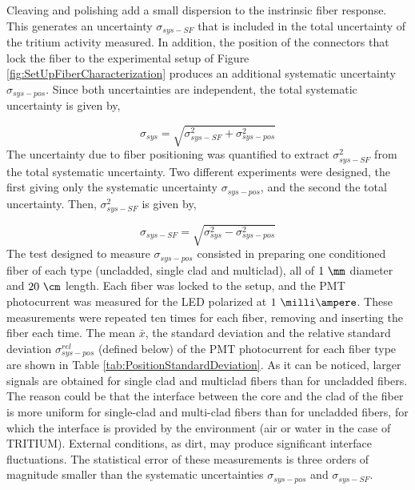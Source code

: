 Cleaving and polishing add a small dispersion to the instrinsic fiber response. This generates an uncertainty $\sigma_{sys-SF}$ that is included in the total uncertainty of the tritium activity measured. In addition, the position of the connectors that lock the fiber to the experimental setup of Figure \ref{fig:SetUpFiberCharacterization} produces an additional systematic uncertainty $\sigma_{sys-pos}$. Since both uncertainties are independent, the total systematic uncertainty is given by,

\begin{equation}
\sigma_{sys} = \sqrt{\sigma^2_{sys-SF} + \sigma^2_{sys-pos} }
\label{eq:TotalUncertaintyFiberCharacterization}
\end{equation}
The uncertainty due to fiber positioning was quantified to extract $\sigma^2_{sys-SF}$ from the total systematic uncertainty. Two different experiments were designed, the first giving only the systematic uncertainty $\sigma_{sys-pos}$, and the second the total uncertainty. Then, $\sigma^2_{sys-SF}$ is given by,

\begin{equation}
\sigma_{sys-SF} = \sqrt{\sigma^2_{sys} - \sigma^2_{sys-pos} }
\label{eq:TMUncertaintyFiberCharacterization}
\end{equation}
The test designed to measure $\sigma_{sys-pos}$ consisted in preparing one conditioned fiber of each type (uncladded, single clad and multiclad), all of $1~\mm$ diameter and $20~\cm$ length. Each fiber was locked to the setup, and the PMT photocurrent was measured for the LED polarized at $1~\milli\ampere$. These measurements were repeated ten times for each fiber, removing and inserting the fiber each time. The mean $\bar{x}$, the standard deviation  and the relative standard deviation $\sigma^{rel}_{sys-pos}$ (defined below) of the PMT photocurrent for each fiber type are shown in Table \ref{tab:PositionStandardDeviation}. As it can be noticed, larger signals are obtained for single clad and multiclad fibers than for uncladded fibers. The reason could be that the interface between the core and the clad of the fiber is more uniform for single-clad and multi-clad fibers than for uncladded fibers, for which the interface is provided by the environment (air or water in the case of TRITIUM). External conditions, as dirt, may produce significant interface fluctuations. The statistical error of these measurements is three orders of magnitude smaller than the systematic uncertainties $\sigma_{sys-pos}$ and $\sigma_{sys-SF}$.


